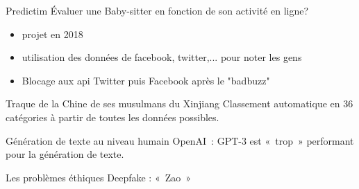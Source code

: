 \begin{frame}{Predictim}
  Évaluer une Baby-sitter en fonction de son activité en ligne?
  \begin{itemize}
    \item projet en 2018
    \item utilisation des données de facebook, twitter,... pour noter les gens
    \item Blocage aux api Twitter puis Facebook après le "badbuzz"
  \end{itemize}
\end{frame}

\begin{frame}{Traque de la Chine de ses musulmans du Xinjiang}
  Classement automatique en 36 catégories à partir de toutes les données possibles.

\end{frame}

\begin{frame}{Génération de texte au niveau humain}
  OpenAI~: GPT-3 est «~trop~» performant pour la génération de texte.
\end{frame}

\begin{frame}{Les problèmes éthiques}
  Deepfake : «~Zao~»
\end{frame}
